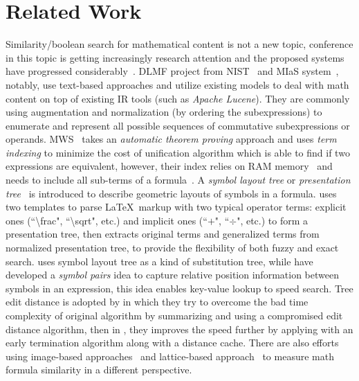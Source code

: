 \documentclass{acm_proc_article-sp}
\begin{document}
\section{Related Work}
Similarity/boolean search for mathematical content is not a new topic,
conference in this topic is getting increasingly research attention and the proposed systems have progressed considerably~\cite{ov}.
DLMF project from NIST~\cite{Youssef03,Youssef05} and MIaS system~\cite{mias11a,mias11,mias:thesis}, notably, use text-based approaches and utilize existing models to deal with math content on top of existing IR tools (such as \textit{Apache Lucene}). 
They are commonly using augmentation and normalization (by ordering the subexpressions) to enumerate and represent all possible sequences of commutative subexpressions or operands.
MWS~\cite{Kohlhase06,Kohlhase0p4,Kohlhase0p5} takes an \textit{automatic theorem proving} approach and uses \textit{term indexing} to minimize the cost of unification algorithm which is able to find if two expressions are equivalent, 
however, their index relies on RAM memory~\cite{Kohlhase0p5} and needs to include all sub-terms of a formula~\cite{Kohlhase06}.
A \textit{symbol layout tree} or \textit{presentation tree}~\cite{symbollayout12,WikiMirs13} is introduced to describe geometric layouts of symbols in a formula. 
\cite{WikiMirs13} uses two templates to parse \LaTeX\ markup with two typical operator terms: explicit ones (``\textbackslash frac", ``\textbackslash sqrt", etc.) and implicit ones (``$+$", ``$\div$", etc.) to form a presentation tree,
then extracts original terms and generalized terms from normalized presentation tree, to provide the flexibility of both fuzzy and exact search.
\cite{symbollayout12} uses symbol layout tree as a kind of substitution tree, while \cite{symbolpairs15,symbolpair15:2} have developed a \textit{symbol pairs} idea to capture relative position information between symbols in an expression,
this idea enables key-value lookup to speed search.
Tree edit distance is adopted by \cite{editdisXML11} in which they try to overcome the bad time complexity of original algorithm by summarizing and using a compromised edit distance algorithm, 
then in \cite{editdisXML13}, they improves the speed further by applying with an early termination algorithm along with a distance cache.
There are also efforts using image-based approaches~\cite{imageb11,handwrite} and lattice-based approach~\cite{lattice} to measure math formula similarity in a different perspective.
\end{document}
